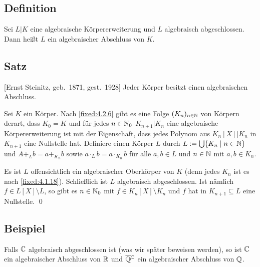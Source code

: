 \subsection{Definition} \ALref{\ref{fixed:4.1.19}} Sei $L|K$ eine algebraische Körpererweiterung und $L$ algebraisch abgeschlossen. Dann heißt $L$ ein algebraischer Abschluss von $K$.

\subsection{Satz} [Ernst Steinitz, geb.~1871, gest.~1928] Jeder Körper besitzt einen algebraischen Abschluss.

\proof Sei $K$ ein Körper. Nach \ref{fixed:4.2.6} gibt es eine Folge $(K_n)_{n \in \mathbb N}$ von Körpern derart, dass $K_0 = K$ und für jedes $n \in \mathbb N_0$ $K_{n+1}|K_n$ eine algebraische Körpererweiterung ist mit der Eigenschaft, dass jedes Polynom aus $K_n[X]|K_n$ in $K_{n+1}$ eine Nullstelle hat. Definiere einen Körper $L$ durch $L := \bigcup \{K_n \mid n \in \mathbb N\}$ und $A +_L b = a +_{K_n} b$ sowie $a \cdot_L b = a \cdot_{K_n} b$ für alle $a,b \in L$ und $n \in \mathbb N$ mit $a,b \in K_n$.

Es ist $L$ offensichtlich ein algebraischer Oberkörper von $K$ (denn jedes $K_n$ ist es nach \ref{fixed:4.1.18}). Schließlich ist $L$ algebraisch abgeschlossen. Ist nämlich $f \in L[X] \setminus L$, so gibt es $n \in \mathbb N_0$ mit $f \in K_n[X] \setminus K_n$ und $f$ hat in $K_{n+1} \subseteq L$ eine Nullstelle. \qed

\subsection{Beispiel} Falls $\mathbb C$ algebraisch abgeschlossen ist (was wir später beweisen werden), so ist $\mathbb C$ ein algebraischer Abschluss von $\mathbb R$ und $\barsmash \Q\C$ \ALref{\ref{4.1.10}} ein algebraischer Abschluss von $\mathbb Q$.